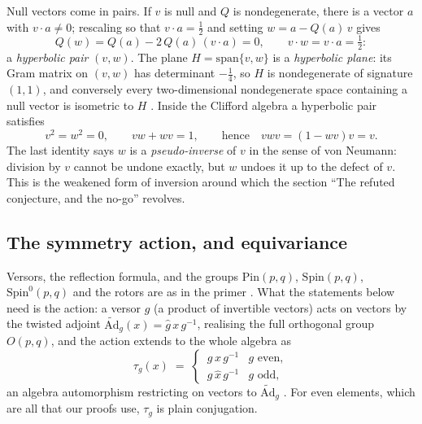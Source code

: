 \documentclass[11pt]{article}
\theoremstyle{definition}
\theoremstyle{plain}
\providecommand{\Ad}{}\renewcommand{\Ad}{\widetilde{\mathrm{Ad}}}
\providecommand{\Pin}{}\renewcommand{\Pin}{\mathrm{Pin}}
\providecommand{\Spin}{}\renewcommand{\Spin}{\mathrm{Spin}}
\begin{document}
Null vectors come in pairs. If $v$ is null and $Q$ is nondegenerate, there is a vector $a$ with $v \cdot a \neq 0$; rescaling so that $v \cdot a = \tfrac12$ and setting $w = a - Q(a)\,v$ gives
\[
Q(w) = Q(a) - 2\,Q(a)\,(v \cdot a) = 0, \qquad v \cdot w = v \cdot a = \tfrac12 :
\]
a \emph{hyperbolic pair} $(v, w)$. The plane $H = \mathrm{span}\{v, w\}$ is a \emph{hyperbolic plane}: its Gram matrix on $(v,w)$ has determinant $-\tfrac14$, so $H$ is nondegenerate of signature $(1,1)$, and conversely every two-dimensional nondegenerate space containing a null vector is isometric to $H$ \cite{Lam2005}. Inside the Clifford algebra a hyperbolic pair satisfies
\begin{equation}
v^2 = w^2 = 0, \qquad vw + wv = 1, \qquad \text{hence} \quad vwv = (1 - wv)v = v .
\end{equation}
The last identity says $w$ is a \emph{pseudo-inverse} of $v$ in the sense of von Neumann: division by $v$ cannot be undone exactly, but $w$ undoes it up to the defect of $v$. This is the weakened form of inversion around which the section ``The refuted conjecture, and the no-go'' revolves.

\subsection*{The symmetry action, and equivariance}
\label{c:note.transport.setting-symmetry-action-equivariance}
Versors, the reflection formula, and the groups $\Pin(p,q)$, $\Spin(p,q)$, $\Spin^0(p,q)$ and the rotors are as in the primer \cite[Section 6]{ButlerT0}. What the statements below need is the action: a versor $g$ (a product of invertible vectors) acts on vectors by the twisted adjoint $\Ad_g(x) = \hat{g}\, x\, g^{-1}$, realising the full orthogonal group $O(p,q)$, and the action extends to the whole algebra as
\begin{equation}
\tau_g(x) \;=\;
\begin{cases}
\,g\, x\, g^{-1} & g \text{ even},\\[2pt]
\,g\, \hat{x}\, g^{-1} & g \text{ odd},
\end{cases}
\end{equation}
an algebra automorphism restricting on vectors to $\Ad_g$ \cite[Lemma 9.2]{ButlerT0}. For even elements, which are all that our proofs use, $\tau_g$ is plain conjugation.
\end{document}
